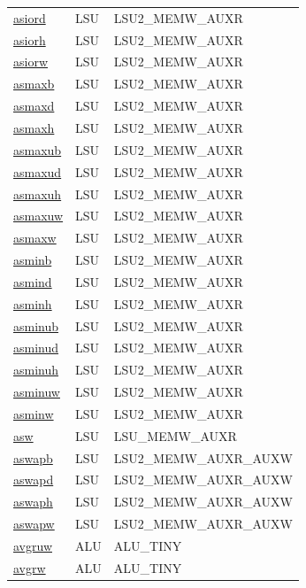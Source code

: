 \begin{small}
\begin{longtable}[l]{l l l}
\hyperlink{lvx.asiord}{asiord} & LSU & LSU2\_MEMW\_AUXR \\ 
\hyperlink{lvx.asiorh}{asiorh} & LSU & LSU2\_MEMW\_AUXR \\ 
\hyperlink{lvx.asiorw}{asiorw} & LSU & LSU2\_MEMW\_AUXR \\ 
\hyperlink{lvx.asmaxb}{asmaxb} & LSU & LSU2\_MEMW\_AUXR \\ 
\hyperlink{lvx.asmaxd}{asmaxd} & LSU & LSU2\_MEMW\_AUXR \\ 
\hyperlink{lvx.asmaxh}{asmaxh} & LSU & LSU2\_MEMW\_AUXR \\ 
\hyperlink{lvx.asmaxub}{asmaxub} & LSU & LSU2\_MEMW\_AUXR \\ 
\hyperlink{lvx.asmaxud}{asmaxud} & LSU & LSU2\_MEMW\_AUXR \\ 
\hyperlink{lvx.asmaxuh}{asmaxuh} & LSU & LSU2\_MEMW\_AUXR \\ 
\hyperlink{lvx.asmaxuw}{asmaxuw} & LSU & LSU2\_MEMW\_AUXR \\ 
\hyperlink{lvx.asmaxw}{asmaxw} & LSU & LSU2\_MEMW\_AUXR \\ 
\hyperlink{lvx.asminb}{asminb} & LSU & LSU2\_MEMW\_AUXR \\ 
\hyperlink{lvx.asmind}{asmind} & LSU & LSU2\_MEMW\_AUXR \\ 
\hyperlink{lvx.asminh}{asminh} & LSU & LSU2\_MEMW\_AUXR \\ 
\hyperlink{lvx.asminub}{asminub} & LSU & LSU2\_MEMW\_AUXR \\ 
\hyperlink{lvx.asminud}{asminud} & LSU & LSU2\_MEMW\_AUXR \\ 
\hyperlink{lvx.asminuh}{asminuh} & LSU & LSU2\_MEMW\_AUXR \\ 
\hyperlink{lvx.asminuw}{asminuw} & LSU & LSU2\_MEMW\_AUXR \\ 
\hyperlink{lvx.asminw}{asminw} & LSU & LSU2\_MEMW\_AUXR \\ 
\hyperlink{lvx.asw}{asw} & LSU & LSU\_MEMW\_AUXR \\ 
\hyperlink{lvx.aswapb}{aswapb} & LSU & LSU2\_MEMW\_AUXR\_AUXW \\ 
\hyperlink{lvx.aswapd}{aswapd} & LSU & LSU2\_MEMW\_AUXR\_AUXW \\ 
\hyperlink{lvx.aswaph}{aswaph} & LSU & LSU2\_MEMW\_AUXR\_AUXW \\ 
\hyperlink{lvx.aswapw}{aswapw} & LSU & LSU2\_MEMW\_AUXR\_AUXW \\ 
\hyperlink{lvx.avgruw}{avgruw} & ALU & ALU\_TINY \\ 
\hyperlink{lvx.avgrw}{avgrw} & ALU & ALU\_TINY \\ 

\end{longtable}
\end{small}
